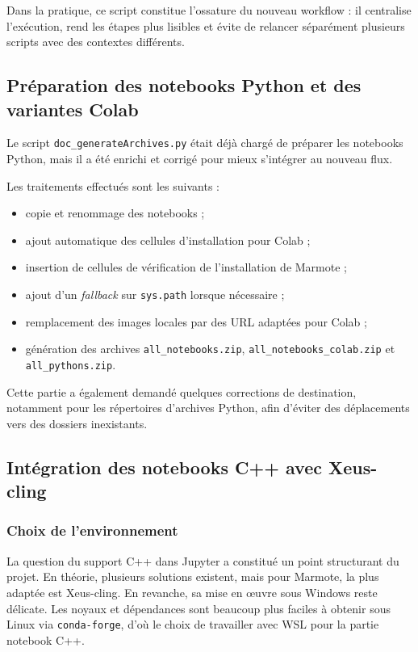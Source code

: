 \documentclass[a4paper,12pt,twoside]{article}
\begin{document}
Dans la pratique, ce script constitue l'ossature du nouveau workflow : il centralise l'exécution, rend les étapes plus lisibles et évite de relancer séparément plusieurs scripts avec des contextes différents.

\subsection{Préparation des notebooks Python et des variantes Colab}

Le script \texttt{doc\_generateArchives.py} était déjà chargé de préparer les notebooks Python, mais il a été enrichi et corrigé pour mieux s'intégrer au nouveau flux.

Les traitements effectués sont les suivants :
\begin{itemize}
    \item copie et renommage des notebooks ;
    \item ajout automatique des cellules d'installation pour Colab ;
    \item insertion de cellules de vérification de l'installation de Marmote ;
    \item ajout d'un \emph{fallback} sur \texttt{sys.path} lorsque nécessaire ;
    \item remplacement des images locales par des URL adaptées pour Colab ;
    \item génération des archives \texttt{all\_notebooks.zip}, \texttt{all\_notebooks\_colab.zip} et \texttt{all\_pythons.zip}.
\end{itemize}

Cette partie a également demandé quelques corrections de destination, notamment pour les répertoires d'archives Python, afin d'éviter des déplacements vers des dossiers inexistants.

\subsection{Intégration des notebooks C++ avec Xeus-cling}

\subsubsection{Choix de l'environnement}

La question du support C++ dans Jupyter a constitué un point structurant du projet. En théorie, plusieurs solutions existent, mais pour Marmote, la plus adaptée est Xeus-cling. En revanche, sa mise en œuvre sous Windows reste délicate. Les noyaux et dépendances sont beaucoup plus faciles à obtenir sous Linux via \texttt{conda-forge}, d'où le choix de travailler avec WSL pour la partie notebook C++.
\end{document}
